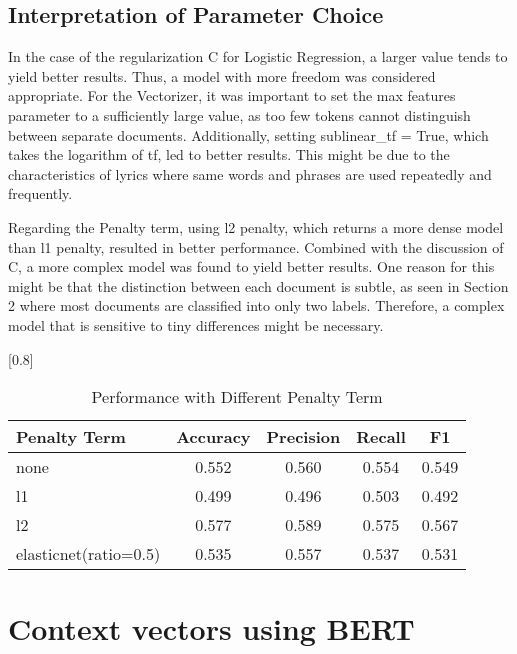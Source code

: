 \documentclass[a4paper,11pt]{article}
\begin{document}
\subsection{Interpretation of Parameter Choice}


In the case of the regularization C for Logistic Regression, a larger value tends to yield better results.
Thus, a model with more freedom was considered appropriate. 
For the Vectorizer, it was important to set the max features parameter to a sufficiently large value, 
as too few tokens cannot distinguish between separate documents.
Additionally, setting sublinear\_tf = True, which takes the logarithm of tf, led to better results.
This might be due to the characteristics of lyrics where same words and phrases are used repeatedly and frequently.

Regarding the Penalty term, using l2 penalty, which returns a more dense model than l1 penalty, resulted in better performance.
Combined with the discussion of C, a more complex model was found to yield better results.
One reason for this might be that the distinction between each document is subtle, as seen in Section 2 where most documents are classified into only two labels. 
Therefore, a complex model that is sensitive to tiny differences might be necessary.

\begin{table}[htbp]
    \centering
    \caption{Performance with Different Penalty Term}
    \small
    \scalebox{0.8}[0.8]{
    \begin{tabular}{l|cccc}
        Penalty Term & Accuracy & Precision & Recall & F1 \\ \hline 
        none & 0.552 & 0.560 & 0.554 & 0.549 \\ 
        l1 & 0.499 & 0.496 & 0.503 & 0.492 \\
        \rowcolor[rgb]{0.9,0.9,0}l2 & 0.577 & 0.589 & 0.575 & 0.567 \\
        elasticnet(ratio=0.5) & 0.535 & 0.557 & 0.537 & 0.531 \\



    \end{tabular}

    }
\end{table}

\section{Context vectors using BERT}
\end{document}
